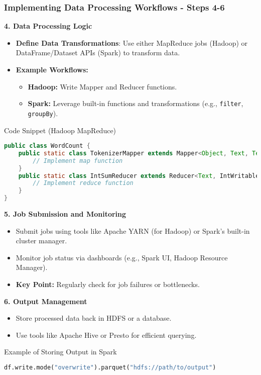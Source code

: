 \documentclass[aspectratio=169]{beamer}
\begin{document}
\begin{frame}[fragile]
    \frametitle{Implementing Data Processing Workflows - Steps 4-6}
    \textbf{4. Data Processing Logic}
    \begin{itemize}
        \item \textbf{Define Data Transformations}: Use either MapReduce jobs (Hadoop) or DataFrame/Dataset APIs (Spark) to transform data.
        \item \textbf{Example Workflows:}
        \begin{itemize}
            \item \textbf{Hadoop:} Write Mapper and Reducer functions.
            \item \textbf{Spark:} Leverage built-in functions and transformations (e.g., \texttt{filter}, \texttt{groupBy}).
        \end{itemize}
    \end{itemize}

    \begin{block}{Code Snippet (Hadoop MapReduce)}
    \begin{lstlisting}[language=java]
public class WordCount {
    public static class TokenizerMapper extends Mapper<Object, Text, Text, IntWritable> {
        // Implement map function
    }
    public static class IntSumReducer extends Reducer<Text, IntWritable, Text, IntWritable> {
        // Implement reduce function
    }
}
    \end{lstlisting}
    \end{block}
    
    \textbf{5. Job Submission and Monitoring}
    \begin{itemize}
        \item Submit jobs using tools like Apache YARN (for Hadoop) or Spark's built-in cluster manager.
        \item Monitor job status via dashboards (e.g., Spark UI, Hadoop Resource Manager).
        \item \textbf{Key Point:} Regularly check for job failures or bottlenecks.
    \end{itemize}

    \textbf{6. Output Management}
    \begin{itemize}
        \item Store processed data back in HDFS or a database.
        \item Use tools like Apache Hive or Presto for efficient querying.
    \end{itemize}

    \begin{block}{Example of Storing Output in Spark}
    \begin{lstlisting}[language=python]
df.write.mode("overwrite").parquet("hdfs://path/to/output")
    \end{lstlisting}
    \end{block}
\end{frame}
\end{document}
